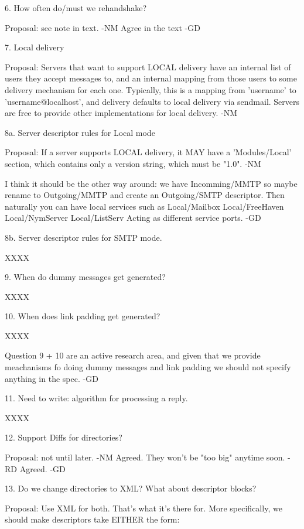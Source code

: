 6. How often do/must we rehandshake?

   Proposal: see note in text. -NM
             Agree in the text -GD

7. Local delivery

   Proposal: Servers that want to support LOCAL delivery have an
   internal list of users they accept messages to, and an internal
   mapping from those users to some delivery mechanism for each one.
   Typically, this is a mapping from 'username' to
   'username@localhost', and delivery defaults to local delivery via
   sendmail.
       Servers are free to provide other implementations for local 
   delivery. -NM


8a. Server descriptor rules for Local mode

   Proposal: If a server supports LOCAL delivery, it MAY have a
   'Modules/Local' section, which contains only a version string,
   which must be "1.0". -NM

   I think it should be the other way around: 
	we have Incomming/MMTP so maybe rename to Outgoing/MMTP
        and create an Outgoing/SMTP descriptor.
        Then naturally you can have local services such as 
		Local/Mailbox
		Local/FreeHaven
		Local/NymServer
		Local/ListServ
	Acting as different service ports. -GD

8b. Server descriptor rules for SMTP mode.

   XXXX

9. When do dummy messages get generated?

   XXXX

10. When does link padding get generated?

   XXXX

   Question 9 + 10 are an active research area, and given that we
   provide meachanisms fo doing dummy messages and link padding we
   should not specify anything in the spec. -GD

11. Need to write: algorithm for processing a reply.

   XXXX

12. Support Diffs for directories?

    Proposal: not until later. -NM
    Agreed. They won't be "too big" anytime soon. -RD
    Agreed. -GD

13. Do we change directories to XML?  What about descriptor blocks?

    Proposal: Use XML for both. That's what it's there for. More
    specifically, we should make descriptors take EITHER the form:

